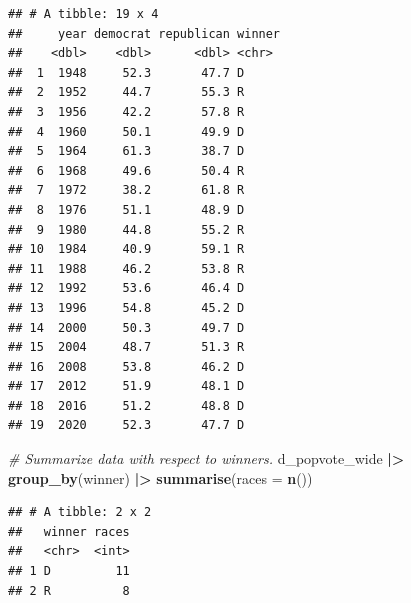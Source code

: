 \documentclass[
]{article}
\newenvironment{Shaded}{\begin{snugshade}}{\end{snugshade}}
\newcommand{\AttributeTok}[1]{\textcolor[rgb]{0.13,0.29,0.53}{#1}}
\newcommand{\CommentTok}[1]{\textcolor[rgb]{0.56,0.35,0.01}{\textit{#1}}}
\newcommand{\FunctionTok}[1]{\textcolor[rgb]{0.13,0.29,0.53}{\textbf{#1}}}
\newcommand{\NormalTok}[1]{#1}
\newcommand{\SpecialCharTok}[1]{\textcolor[rgb]{0.81,0.36,0.00}{\textbf{#1}}}
\begin{document}
\begin{verbatim}
## # A tibble: 19 x 4
##     year democrat republican winner
##    <dbl>    <dbl>      <dbl> <chr> 
##  1  1948     52.3       47.7 D     
##  2  1952     44.7       55.3 R     
##  3  1956     42.2       57.8 R     
##  4  1960     50.1       49.9 D     
##  5  1964     61.3       38.7 D     
##  6  1968     49.6       50.4 R     
##  7  1972     38.2       61.8 R     
##  8  1976     51.1       48.9 D     
##  9  1980     44.8       55.2 R     
## 10  1984     40.9       59.1 R     
## 11  1988     46.2       53.8 R     
## 12  1992     53.6       46.4 D     
## 13  1996     54.8       45.2 D     
## 14  2000     50.3       49.7 D     
## 15  2004     48.7       51.3 R     
## 16  2008     53.8       46.2 D     
## 17  2012     51.9       48.1 D     
## 18  2016     51.2       48.8 D     
## 19  2020     52.3       47.7 D
\end{verbatim}

\begin{Shaded}
\begin{Highlighting}[]
\CommentTok{\# Summarize data with respect to winners. }
\NormalTok{d\_popvote\_wide }\SpecialCharTok{|\textgreater{}} 
  \FunctionTok{group\_by}\NormalTok{(winner) }\SpecialCharTok{|\textgreater{}}
  \FunctionTok{summarise}\NormalTok{(}\AttributeTok{races =} \FunctionTok{n}\NormalTok{())}
\end{Highlighting}
\end{Shaded}

\begin{verbatim}
## # A tibble: 2 x 2
##   winner races
##   <chr>  <int>
## 1 D         11
## 2 R          8
\end{verbatim}
\end{document}
